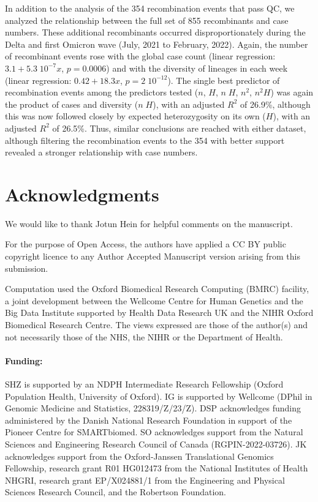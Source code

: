 \documentclass[12pt]{article}
\begin{document}
In addition to the analysis of the 354 recombination events that pass QC,
we analyzed the relationship between the full set of 855 recombinants and case numbers.
These additional recombinants occurred disproportionately
during the Delta and first Omicron wave (July, 2021 to February, 2022).
Again, the number of recombinant events rose with the global case count
(linear regression: $3.1 + 5.3 \; 10^{-7} x$, $p = 0.0006$)
and with the diversity of lineages in each week
(linear regression: $0.42 + 18.3 x$, $p = 2 \; 10^{-12}$).
The single best predictor of recombination events
among the predictors tested ($n$, $H$, $n \; H$, $n^2$, $n^2 H$)
was again the product of cases and diversity ($n \; H$),
with an adjusted $R^2$ of 26.9\%,
although this was now followed closely by expected heterozygosity on its own ($H$),
with an adjusted $R^2$ of 26.5\%.
Thus, similar conclusions are reached with either dataset,
although filtering the recombination events to the 354
with better support revealed a stronger relationship with case numbers.


\bigskip


\section*{Acknowledgments}
We would like to thank Jotun Hein for helpful comments on the manuscript.

For the purpose of Open Access, the authors have applied a CC BY public
copyright licence to any Author Accepted Manuscript version arising from this
submission.

Computation used the Oxford Biomedical Research Computing (BMRC) facility, a
joint development between the Wellcome Centre for Human Genetics and the Big
Data Institute supported by Health Data Research UK and the NIHR Oxford
Biomedical Research Centre. The views expressed are those of the author(s) and
not necessarily those of the NHS, the NIHR or the Department of Health.

\paragraph*{Funding:}
SHZ is supported by an NDPH Intermediate Research Fellowship (Oxford Population
Health, University of Oxford).
IG is supported by Wellcome (DPhil in Genomic Medicine and Statistics, 228319/Z/23/Z).
DSP acknowledges funding administered by the Danish National Research Foundation
in support of the Pioneer Centre for SMARTbiomed.
SO acknowledges support from the Natural Sciences and Engineering Research Council of Canada (RGPIN-2022-03726).
JK acknowledges support from the
Oxford-Janssen Translational Genomics Fellowship,
research grant R01 HG012473 from the National Institutes of Health NHGRI,
research grant EP/X024881/1 from the Engineering and Physical Sciences Research Council,
and the Robertson Foundation.
\end{document}
